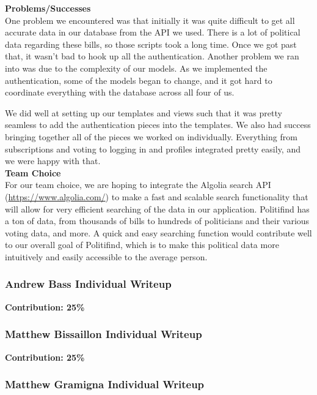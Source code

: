 \documentclass{article}
\newcommand{\n}{\noindent}
\begin{document}
\n\textbf{Problems/Successes} \\

One problem we encountered was that initially it was quite difficult to get all accurate data in our database from the API we used. There is a lot of political data regarding these bills, so those scripts took a long time. Once we got past that, it wasn't bad to hook up all the authentication. Another problem we ran into was due to the complexity of our models. As we implemented the authentication, some of the models began to change, and it got hard to coordinate everything with the database across all four of us.

We did well at setting up our templates and views such that it was pretty seamless to add the authentication pieces into the templates. We also had success bringing together all of the pieces we worked on individually. Everything from subscriptions and voting to logging in and profiles integrated pretty easily, and we were happy with that.\\

\n\textbf{Team Choice} \\

For our team choice, we are hoping to integrate the Algolia search API (\url{https://www.algolia.com/}) to make a fast and scalable search functionality that will allow for very efficient searching of the data in our application. Politifind has a ton of data, from thousands of bills to hundreds of politicians and their various voting data, and more. A quick and easy searching function would contribute well to our overall goal of Politifind, which is to make this political data more intuitively and easily accessible to the average person.

\pagebreak

\subsubsection*{Andrew Bass Individual Writeup}

\n\textbf{Contribution: 25\%}

\pagebreak

\subsubsection*{Matthew Bissaillon Individual Writeup}

\n\textbf{Contribution: 25\%}
\pagebreak

\subsubsection*{Matthew Gramigna Individual Writeup}
\end{document}
